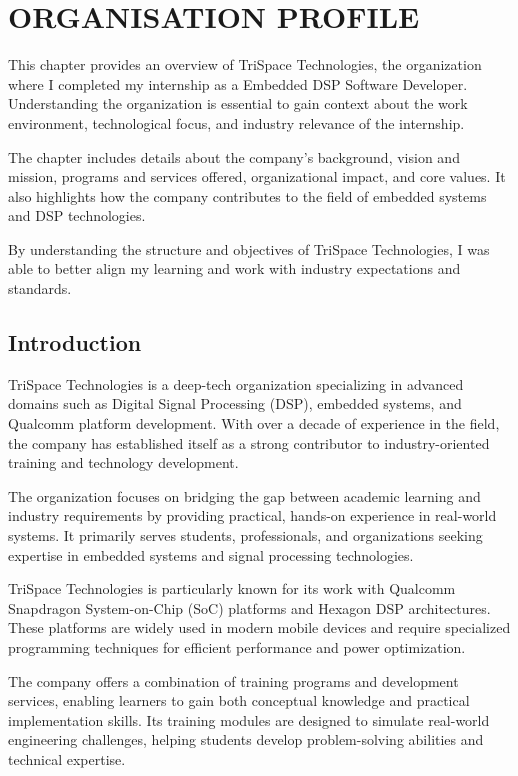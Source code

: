 \documentclass[12pt,a4paper]{report}
\begin{document}
\chapter{ORGANISATION PROFILE}
\label{ch:org}


This chapter provides an overview of TriSpace Technologies, the organization where I completed my internship as a Embedded DSP Software Developer. Understanding the organization is essential to gain context about the work environment, technological focus, and industry relevance of the internship.


The chapter includes details about the company’s background, vision and mission, programs and services offered, organizational impact, and core values. It also highlights how the company contributes to the field of embedded systems and DSP technologies.


By understanding the structure and objectives of TriSpace Technologies, I was able to better align my learning and work with industry expectations and standards.


\section{Introduction}

TriSpace Technologies is a deep-tech organization specializing in advanced domains such as Digital Signal Processing (DSP), embedded systems, and Qualcomm platform development. With over a decade of experience in the field, the company has established itself as a strong contributor to industry-oriented training and technology development.


The organization focuses on bridging the gap between academic learning and industry requirements by providing practical, hands-on experience in real-world systems. It primarily serves students, professionals, and organizations seeking expertise in embedded systems and signal processing technologies.


TriSpace Technologies is particularly known for its work with Qualcomm Snapdragon System-on-Chip (SoC) platforms and Hexagon DSP architectures. These platforms are widely used in modern mobile devices and require specialized programming techniques for efficient performance and power optimization.


The company offers a combination of training programs and development services, enabling learners to gain both conceptual knowledge and practical implementation skills. Its training modules are designed to simulate real-world engineering challenges, helping students develop problem-solving abilities and technical expertise.
\end{document}
